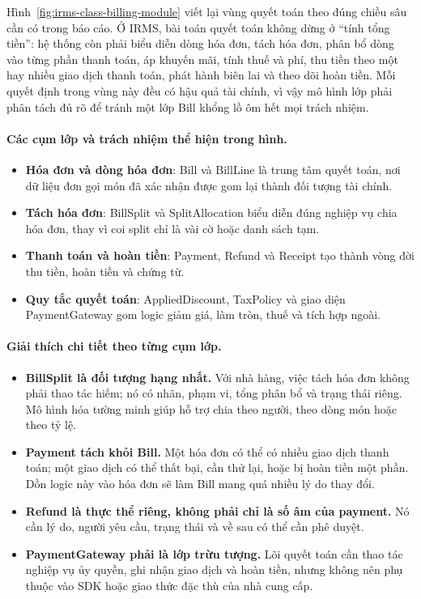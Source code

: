 \documentclass[11pt,a4paper]{article}
\begin{document}
Hình~\ref{fig:irms-class-billing-module} viết lại vùng quyết toán theo đúng chiều sâu cần có trong báo cáo. Ở IRMS, bài toán quyết toán không dừng ở \enquote{tính tổng tiền}: hệ thống còn phải biểu diễn dòng hóa đơn, tách hóa đơn, phân bổ dòng vào từng phần thanh toán, áp khuyến mãi, tính thuế và phí, thu tiền theo một hay nhiều giao dịch thanh toán, phát hành biên lai và theo dõi hoàn tiền. Mỗi quyết định trong vùng này đều có hậu quả tài chính, vì vậy mô hình lớp phải phân tách đủ rõ để tránh một lớp \textsf{Bill} khổng lồ ôm hết mọi trách nhiệm.

\paragraph{Các cụm lớp và trách nhiệm thể hiện trong hình.}
\begin{itemize}
  \item \textbf{Hóa đơn và dòng hóa đơn}: \textsf{Bill} và \textsf{BillLine} là trung tâm quyết toán, nơi dữ liệu đơn gọi món đã xác nhận được gom lại thành đối tượng tài chính.
  \item \textbf{Tách hóa đơn}: \textsf{BillSplit} và \textsf{SplitAllocation} biểu diễn đúng nghiệp vụ chia hóa đơn, thay vì coi split chỉ là vài cờ hoặc danh sách tạm.
  \item \textbf{Thanh toán và hoàn tiền}: \textsf{Payment}, \textsf{Refund} và \textsf{Receipt} tạo thành vòng đời thu tiền, hoàn tiền và chứng từ.
  \item \textbf{Quy tắc quyết toán}: \textsf{AppliedDiscount}, \textsf{TaxPolicy} và giao diện \textsf{PaymentGateway} gom logic giảm giá, làm tròn, thuế và tích hợp ngoài.
\end{itemize}

\paragraph{Giải thích chi tiết theo từng cụm lớp.}
\begin{itemize}
  \item \textbf{BillSplit là đối tượng hạng nhất.} Với nhà hàng, việc tách hóa đơn không phải thao tác hiếm; nó có nhãn, phạm vi, tổng phân bổ và trạng thái riêng. Mô hình hóa tường minh giúp hỗ trợ chia theo người, theo dòng món hoặc theo tỷ lệ.
  \item \textbf{Payment tách khỏi Bill.} Một hóa đơn có thể có nhiều giao dịch thanh toán; một giao dịch có thể thất bại, cần thử lại, hoặc bị hoàn tiền một phần. Dồn logic này vào hóa đơn sẽ làm \textsf{Bill} mang quá nhiều lý do thay đổi.
  \item \textbf{Refund là thực thể riêng, không phải chỉ là số âm của payment.} Nó cần lý do, người yêu cầu, trạng thái và về sau có thể cần phê duyệt.
  \item \textbf{PaymentGateway phải là lớp trừu tượng.} Lõi quyết toán cần thao tác nghiệp vụ ủy quyền, ghi nhận giao dịch và hoàn tiền, nhưng không nên phụ thuộc vào SDK hoặc giao thức đặc thù của nhà cung cấp.
\end{itemize}
\end{document}
